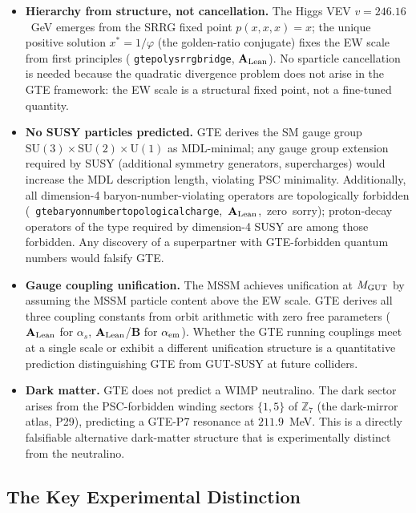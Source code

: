 \documentclass[11pt,openany]{book}
\theoremstyle{remark}
\newcommand{\ZS}{\mathbb{Z}_7}
\newcommand{\lean}[1]{%
  \penalty-100
  \begingroup\def\_{\textunderscore\allowbreak}\texttt{#1}\endgroup}
\newcommand{\CatAL}{\ensuremath{\textbf{A}_{\rm Lean}}}
\newcommand{\CatB}{\textbf{B}}
\begin{document}
\begin{itemize}[itemsep=4pt]
\item \textbf{Hierarchy from structure, not cancellation.}  The Higgs VEV
  $v = 246.16$~GeV emerges from the SRRG fixed point $p(x,x,x)=x$; the unique
  positive solution $x^* = 1/\varphi$ (the golden-ratio conjugate) fixes the
  EW scale from first principles (\lean{gte\_poly\_srrg\_bridge}, \CatAL).
  No sparticle cancellation is needed because the quadratic divergence problem
  does not arise in the GTE framework: the EW scale is a structural fixed point,
  not a fine-tuned quantity.

\item \textbf{No SUSY particles predicted.}  GTE derives the SM gauge group
  $\mathrm{SU}(3)\times\mathrm{SU}(2)\times\mathrm{U}(1)$ as MDL-minimal; any gauge
  group extension required by SUSY (additional symmetry generators, supercharges)
  would increase the MDL description length, violating PSC minimality.
  Additionally, all dimension-4 baryon-number-violating operators are topologically
  forbidden \mbox{(\lean{gte\_baryon\_number\_topological\_charge}, \CatAL, zero sorry)};
  proton-decay operators of the type required by dimension-4 SUSY are among those
  forbidden.  Any discovery of a superpartner with GTE-forbidden quantum numbers would
  falsify GTE.

\item \textbf{Gauge coupling unification.}  The MSSM achieves unification at
  $M_{\rm GUT}$ by assuming the MSSM particle content above the EW scale.  GTE derives
  all three coupling constants from orbit arithmetic with zero free parameters (\CatAL
  for $\alpha_s$, \CatAL/$\CatB$ for $\alpha_{\rm em}$).  Whether the GTE running
  couplings meet at a single scale or exhibit a different unification structure is a
  quantitative prediction distinguishing GTE from GUT-SUSY at future colliders.

\item \textbf{Dark matter.}  GTE does not predict a WIMP neutralino.  The dark sector
  arises from the PSC-forbidden winding sectors $\{1,5\}$ of $\ZS$ (the dark-mirror
  atlas, P29), predicting a GTE-P7 resonance at $211.9$~MeV.  This is a directly
  falsifiable alternative dark-matter structure that is experimentally distinct from
  the neutralino.
\end{itemize}

\subsection*{The Key Experimental Distinction}
\end{document}
